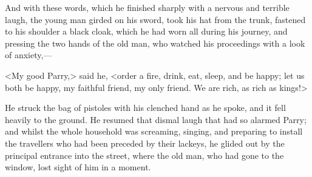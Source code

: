 And with these words, which he finished sharply with a nervous and terrible laugh, the young man girded on his sword, took his hat from the trunk, fastened to his shoulder a black cloak, which he had worn all during his journey, and pressing the two hands of the old man, who watched his proceedings with a look of anxiety,—

<My good Parry,> said he, <order a fire, drink, eat, sleep, and be happy; let us both be happy, my faithful friend, my only friend. We are rich, as rich as kings!>

He struck the bag of pistoles with his clenched hand as he spoke, and it fell heavily to the ground. He resumed that dismal laugh that had so alarmed Parry; and whilst the whole household was screaming, singing, and preparing to install the travellers who had been preceded by their lackeys, he glided out by the principal entrance into the street, where the old man, who had gone to the window, lost sight of him in a moment. 